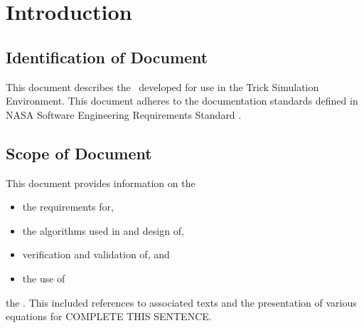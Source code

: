 \documentclass[twoside,11pt,titlepage]{report}
\begin{document}

\date{DATE}
\modelname{\MODEL}
\doctype{}
\author{YOUR NAME}
\makeTrickhlaenvTitlepage



\tableofcontents
\vfill

\pagebreak


\chapter{Introduction}


\section{Identification of Document}
This document describes the \MODEL\ developed
for use in the Trick Simulation Environment.
This document adheres to the documentation standards
defined in NASA Software Engineering Requirements Standard \cite{NASA:SWE}.

\section{Scope of Document}
This document provides information on the
\begin{itemize}
\item the requirements for,
\item the algorithms used in and design of,
\item verification and validation of, and
\item the use of
\end{itemize}
the \MODEL. This included references to associated texts and the
presentation of various equations for COMPLETE THIS SENTENCE.
\end{document}
